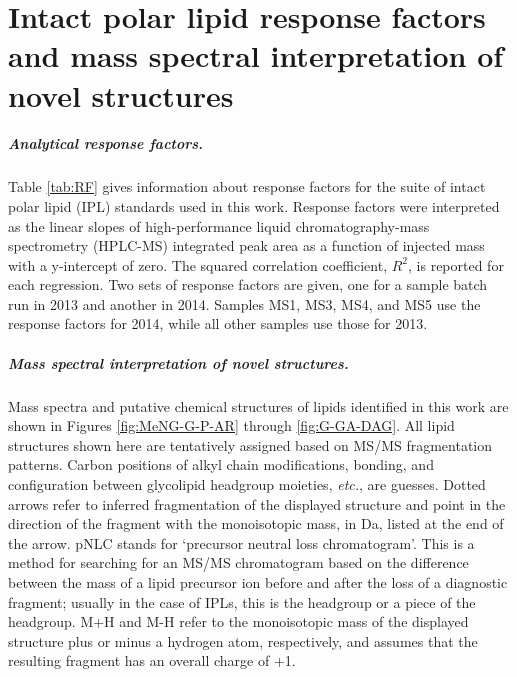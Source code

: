 \chapter{Intact polar lipid response factors and mass spectral interpretation of novel structures}\label{app1}

\clearpage

\doublespace

\paragraph*{Analytical response factors.} Table \ref{tab:RF} gives information about response factors for the suite of intact polar lipid (IPL) standards used in this work. Response factors were interpreted as the linear slopes of high-performance liquid chromatography-mass spectrometry (HPLC-MS) integrated peak area as a function of injected mass with a y-intercept of zero. The squared correlation coefficient, $R^{2}$, is reported for each regression. Two sets of response factors are given, one for a sample batch run in 2013 and another in 2014. Samples MS1, MS3, MS4, and MS5 use the response factors for 2014, while all other samples use those for 2013.

\paragraph*{Mass spectral interpretation of novel structures.} Mass spectra and putative chemical structures of lipids identified in this work are shown in Figures \ref{fig:MeNG-G-P-AR} through \ref{fig:G-GA-DAG}. All lipid structures shown here are tentatively assigned based on MS/MS fragmentation patterns. Carbon positions of alkyl chain modifications, bonding, and configuration between glycolipid headgroup moieties, \textit{etc.}, are guesses. Dotted arrows refer to inferred fragmentation of the displayed structure and point in the direction of the fragment with the monoisotopic mass, in Da, listed at the end of the arrow. pNLC stands for `precursor neutral loss chromatogram'. This is a method for searching for an MS/MS chromatogram based on the difference between the mass of a lipid precursor ion before and after the loss of a diagnostic fragment; usually in the case of IPLs, this is the headgroup or a piece of the headgroup. M+H and M-H refer to the monoisotopic mass of the displayed structure plus or minus a hydrogen atom, respectively, and assumes that the resulting fragment has an overall charge of +1.

